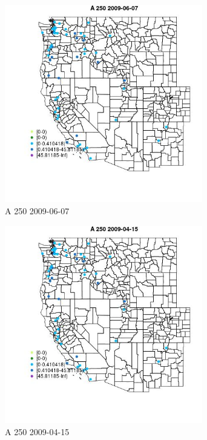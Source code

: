 \begin{figure} 
\centering  
\includegraphics[width=0.77\textwidth]{Code_Outputs/Report_ML_input_PM25_Step4_part_e_de_duplicated_aves_MapObsA_2502009-06-07.jpg} 
\caption{\label{fig:Report_ML_input_PM25_Step4_part_e_de_duplicated_avesMapObsA_2502009-06-07}A 250 2009-06-07} 
\end{figure} 
 

\clearpage 

\begin{figure} 
\centering  
\includegraphics[width=0.77\textwidth]{Code_Outputs/Report_ML_input_PM25_Step4_part_e_de_duplicated_aves_MapObsA_2502009-04-15.jpg} 
\caption{\label{fig:Report_ML_input_PM25_Step4_part_e_de_duplicated_avesMapObsA_2502009-04-15}A 250 2009-04-15} 
\end{figure} 
 

